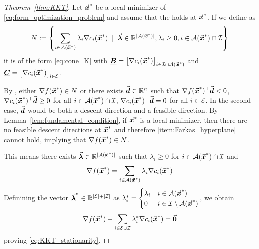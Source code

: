 \begin{proof}[Theorem~\ref{thm:KKT}]
  Let \(\vec{\boldsymbol{x}}^{\ast}\) be a local minimizer of \eqref{eq:form_optimization_problem} and assume that the  holds at \(\vec{\boldsymbol{x}}^{\ast}\).
  If we define as
  \begin{equation}\label{eq:cone_N}
    N := \left\{ \sum_{i\in\mathcal{A}(\vec{\boldsymbol{x}}^{\ast})} \lambda_{i} \nabla c_{i}(\vec{\boldsymbol{x}}^{\ast}) \;\mid\; \vec{\boldsymbol{\lambda}} \in \mathbb{R}^{|\mathcal{A}(\vec{\boldsymbol{x}}^{\ast})|}, \lambda_{i} \ge 0, i\in \mathcal{A}(\vec{\boldsymbol{x}}^{\ast}) \cap \mathcal{I} \right\}
  \end{equation}
  it is of the form \eqref{eq:cone_K} with \(\underline{\boldsymbol{B}} = \left[ \nabla c_{i}(\vec{\boldsymbol{x}}^{\ast}) \right]_{i\in{\mathcal{I}\cap\mathcal{A}(\vec{\boldsymbol{x}}^{\ast})}}\) and \(\underline{\boldsymbol{C}} = \left[ \nabla c_{i}(\vec{\boldsymbol{x}}^{\ast}) \right]_{i\in{\mathcal{E}}}\).
  
  By , either \(\nabla f(\vec{\boldsymbol{x}}^{\ast}) \in N\) or there exists \(\vec{\boldsymbol{d}}\in\mathbb{R}^{n}\) such that \(\nabla f(\vec{\boldsymbol{x}}^{\ast})^{\top} \vec{\boldsymbol{d}} < 0\), \(\nabla c_{i}(\vec{\boldsymbol{x}}^{\ast})^{\top} \vec{\boldsymbol{d}} \ge 0\) for all \(i\in\mathcal{A(\vec{\boldsymbol{x}}^{\ast})} \cap \mathcal{I}\), \(\nabla c_{i}(\vec{\boldsymbol{x}}^{\ast})^{\top} \vec{\boldsymbol{d}} = 0\) for all \(i\in\mathcal{E}\).
  In the second case, \(\vec{\boldsymbol{d}}\) would be both a descent direction and a feasible direction. 
  By Lemma~\ref{lem:fundamental_condition}, if \(\vec{\boldsymbol{x}}^{\ast}\) is a local minimizer, then there are no feasible descent directions at \(\vec{\boldsymbol{x}}^{\ast}\) and therefore \ref{item:Farkas_hyperplane} cannot hold, implying that \(\nabla f(\vec{\boldsymbol{x}}^{\ast}) \in N\).

  This means there exists \(\vec{\boldsymbol{\lambda}} \in \mathbb{R}^{|\mathcal{A(\vec{\boldsymbol{x}}^{\ast})|}}\) such that \(\lambda_{i} \ge 0\) for \(i\in\mathcal{A(\vec{\boldsymbol{x}}^{\ast})} \cap \mathcal{I} \) and
  \begin{equation}\label{eq:grad_linear_combination}
    \nabla f(\vect{x}^{\ast}) = \sum_{i\in\mathcal{A}(\vect{x}^{\ast})} \lambda_{i} \nabla c_{i}(\vect{x}^{\ast})%
  \end{equation}
  Definining the vector \(\vec{\boldsymbol{\lambda}}^{\ast} \in \mathbb{R}^{|\mathcal{E}|+|\mathcal{I}|}\) as 
  \(
    \lambda_{i}^{\ast} = \begin{cases}
      \lambda_{i} & i \in \mathcal{A}(\vec{\boldsymbol{x}}^{\ast}) \\
      0           & i \in \mathcal{I} \setminus \mathcal{A}(\vec{\boldsymbol{x}}^{\ast})
    \end{cases}
  \),
  we obtain
  \begin{equation}\label{eq:KKT_stationarity_proof}
    \nabla f(\vec{\boldsymbol{x}}^{\ast}) - \sum_{i\in\mathcal{E}\cup\mathcal{I}} \lambda_{i}^{\ast} \nabla c_{i}(\vec{\boldsymbol{x}}^{\ast}) = \vec{\boldsymbol{0}}
  \end{equation}
  proving \eqref{eq:KKT_stationarity}.
  

\end{proof}
